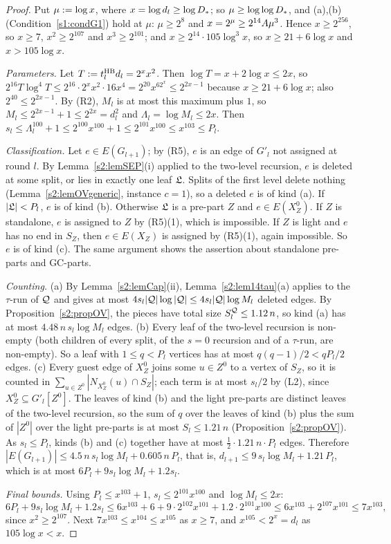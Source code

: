 \begin{proof}
Put $\mu\mathrel{:=}\log x$, where $x=\log d_l\ge\log D_{*}$; so $\mu\ge\log\log D_{*}$,
and (a),(b) (Condition~\ref{s1:condG1}) hold at $\mu$: $\mu\ge2^8$ and
$x=2^\mu\ge2^{14}A\mu^3$. Hence $x\ge2^{256}$, so $x\ge7$, $x^2\ge2^{107}$ and
$x^3\ge2^{101}$; and $x\ge2^{14}\cdot105\log^3x$, so $x\ge21+6\log x$ and
$x>105\log x$.

\emph{Parameters.} Let $T\mathrel{:=}t^{\mathrm{HB}}_ld_l=2^xx^2$. Then $\log T=x+2\log x\le2x$,
so $2^{16}T\log^4T\le2^{16}\cdot2^xx^2\cdot16x^4=2^{20}x^62^x\le2^{2x-1}$ because
$x\ge21+6\log x$; also $2^{40}\le2^{2x-1}$. By (R2), $M_l$ is at most this
maximum plus $1$, so $M_l\le2^{2x-1}+1\le2^{2x}=d_l^2$ and
$\Lambda_l=\log M_l\le2x$. Then $s_l\le\Lambda_l^{100}+1\le2^{100}x^{100}+1\le
2^{101}x^{100}\le x^{103}\le P_l$.

\emph{Classification.} Let $e\in E(G_{l+1})$; by (R5), $e$ is an edge of $G'_l$
not assigned at round $l$. By Lemma~\ref{s2:lemSEP}(i) applied to the two-level
recursion, $e$ is deleted at some split, or lies in exactly one leaf $\mathfrak{L}$.
Splits of the first level delete nothing (Lemma~\ref{s2:lemOVgeneric}, instance
$c=1$), so a deleted $e$ is of kind (a). If $|\mathfrak{L}|<P_l$, $e$ is of kind (b).
Otherwise $\mathfrak{L}$ is a pre-part $Z$ and $e\in E(X^0_Z)$. If $Z$ is standalone,
$e$ is assigned to $Z$ by (R5)(1), which is impossible. If $Z$ is light and $e$
has no end in $S_Z$, then $e\in E(X_Z)$ is assigned by (R5)(1), again
impossible. So $e$ is of kind (c). The same argument shows the assertion about
standalone pre-parts and GC-parts.

\emph{Counting.} (a) By Lemma~\ref{s2:lemCap}(ii), Lemma~\ref{s2:lem14tau}(a)
applies to the $\tau$-run of $\mathcal{Q}$ and gives at most
$4s_l|\mathcal{Q}|\log|\mathcal{Q}|\le4s_l|\mathcal{Q}|\log M_l$ deleted edges. By
Proposition~\ref{s2:propOV}, the pieces have total size
$S^{\mathcal{Q}}_l\le1.12\,n$, so kind (a) has at most $4.48\,n\,s_l\log M_l$ edges.
(b) Every leaf of the two-level recursion is non-empty (both children of every
split, of the $s=0$ recursion and of a $\tau$-run, are non-empty). So a leaf
with $1\le q<P_l$ vertices has at most $q(q-1)/2<qP_l/2$ edges.
(c) Every guest edge of $X^0_Z$ joins some $u\in Z^0$ to a vertex of $S_Z$, so
it is counted in $\sum_{u\in Z^0}|N_{X^0_Z}(u)\cap S_Z|$; each term is at most
$s_l/2$ by (L2), since $X^0_Z\subseteq G'_l[Z^0]$. The leaves of kind (b) and
the light pre-parts are distinct leaves of the two-level recursion, so the sum
of $q$ over the leaves of kind (b) plus the sum of $|Z^0|$ over the light
pre-parts is at most $S_l\le1.21\,n$ (Proposition~\ref{s2:propOV}). As
$s_l\le P_l$, kinds (b) and (c) together have at most
$\frac12\cdot1.21\,n\cdot P_l$ edges. Therefore
$|E(G_{l+1})|\le4.5\,n\,s_l\log M_l+0.605\,n\,P_l$, that is,
$d_{l+1}\le9\,s_l\log M_l+1.21\,P_l$, which is at most
$6P_l+9s_l\log M_l+1.2s_l$.

\emph{Final bounds.} Using $P_l\le x^{103}+1$, $s_l\le2^{101}x^{100}$ and
$\log M_l\le2x$:
\[
6P_l+9s_l\log M_l+1.2s_l\le6x^{103}+6+9\cdot2^{102}x^{101}+1.2\cdot2^{101}x^{100}
\le6x^{103}+2^{107}x^{101}\le7x^{103},
\]
since $x^2\ge2^{107}$. Next $7x^{103}\le x^{104}\le x^{105}$ as $x\ge7$, and
$x^{105}<2^x=d_l$ as $105\log x<x$.
\end{proof}

